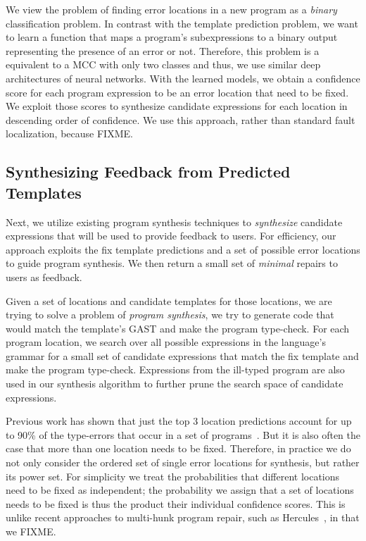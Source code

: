  We view the problem of finding error locations in a
new program as a \emph{binary} classification problem. In contrast with the
template prediction problem, we want to learn a function that maps a program's
subexpressions to a binary output representing the presence of an error or not.
Therefore, this problem is a equivalent to a MCC with only two classes and thus,
we use similar deep architectures of neural networks. With the learned models, we
obtain a confidence score for each program expression to be an error location
that need to be fixed. We exploit those scores to synthesize candidate
expressions for each location in descending order of confidence. We use
this approach, rather than standard fault localization, because FIXME.

\subsection{Synthesizing Feedback from Predicted Templates}
\label{sec:overview:synthesis}

Next, we utilize existing program synthesis techniques to \emph{synthesize}
candidate expressions that will be used to provide feedback to users. For efficiency, our
approach exploits the fix template predictions and a set of possible error
locations to guide program synthesis. We then
return a small set of \emph{minimal} repairs to users as feedback.

 Given a set of locations and candidate templates for
those locations, we are trying to solve a problem of \emph{program synthesis},
\ie we try to generate code that would match the template's GAST and make the
program type-check. For each program location, we search over all possible
expressions in the language's grammar for a small set of candidate
expressions that match the fix template and make the program type-check.
Expressions from the ill-typed program are also used in our synthesis algorithm
to further prune the search space of candidate expressions.

 Previous work has shown that just the
top 3 location predictions account for up to 90\% of the type-errors that occur
in a set of programs~\cite{FIXME}.
But it is also often the case that more than one location
needs to be fixed. Therefore, in practice we do not only consider the ordered set
of single error locations for synthesis, but rather its power set.
For simplicity we treat the probabilities that different locations need to be fixed
as independent; the probability we assign that a set of locations needs to be fixed
is thus the product their individual confidence scores. This is unlike
recent approaches to multi-hunk program repair, such as
Hercules~\cite{FIXME}, in that we FIXME.

